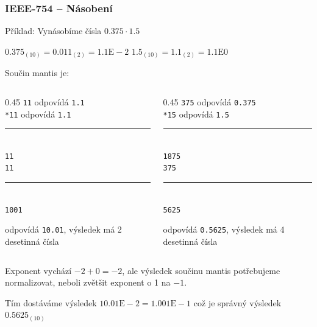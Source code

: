 \begin{frame}
\frametitle{IEEE-754 -- Násobení}

Příklad: Vynásobíme čísla $0.375 \cdot 1.5$

$0.375_{(10)} = 0.011_{(2)} = 1.1\text{E}-2$ \phantom{xxx} $1.5_{(10)} = 1.1_{(2)} = 1.1\text{E}0$

Součin mantis je:\\
\begin{columns}
\begin{column}{0.45\textwidth}
\texttt{\phantom{xxx}11} odpovídá \texttt{1.1}\\
\texttt{\phantom{xx}*11} odpovídá \texttt{1.1}\vspace{-6pt}\\
\rule[0pt]{2cm}{0.4pt}\\
\texttt{\phantom{xxx}11}\\
\texttt{\phantom{xx}11}\vspace{-6pt}\\
\rule[0pt]{2cm}{0.4pt}\\
\texttt{\phantom{x}1001} 

odpovídá \texttt{10.01}, výsledek má 2 desetinná čísla
\end{column}
\hfill
\begin{column}{0.45\textwidth}
\texttt{\phantom{xx}375} odpovídá \texttt{0.375}\\
\texttt{\phantom{xx}*15} odpovídá \texttt{1.5}\vspace{-6pt}\\
\rule[0pt]{2cm}{0.4pt}\\
\texttt{\phantom{x}1875}\\
\texttt{\phantom{x}375}\vspace{-6pt}\\
\rule[0pt]{2cm}{0.4pt}\\
\texttt{\phantom{x}5625} 

odpovídá \texttt{0.5625}, výsledek má 4 desetinná čísla
\end{column}
\end{columns}
\bigskip

Exponent vychází $-2+0=-2$, ale výsledek součinu mantis potřebujeme normalizovat, neboli zvětšit exponent o 1 na $-1$.

Tím dostáváme výsledek $10.01\text{E}-2 = 1.001\text{E}-1$ což je správný výsledek $0.5625_{(10)}$

\end{frame}

